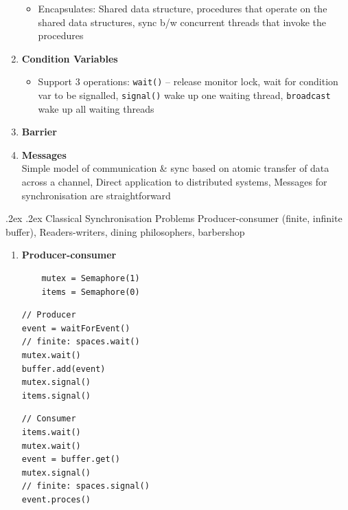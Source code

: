 \documentclass[10pt,landscape,a4paper]{article}
\makeatletter
\renewcommand{\subsubsection}{\@startsection{subsubsection}{1}{0mm}%
  {.2ex}%
  {.2ex}%
{\rmfamily\bfseries}}
\makeatother
\begin{document}
\begin{multicols*}{4}
\begin{enumerate}
\begin{itemize}
            \item Encapsulates: Shared data structure, procedures that operate on the shared data structures, sync b/w concurrent threads that invoke the procedures
          \end{itemize}
    \item \textbf{Condition Variables}
          \begin{itemize}
            \item Support 3 operations: \texttt{wait()} -- release monitor lock, wait for condition var to be signalled, \texttt{signal()} wake up one waiting thread, \texttt{broadcast} wake up all waiting threads
          \end{itemize}
    \item \textbf{Barrier}
    \item \textbf{Messages}\\
          Simple model of communication \& sync based on atomic transfer of data across a channel, Direct application to distributed systems, Messages for synchronisation are straightforward
  \end{enumerate}
  \subsubsection{Classical Synchronisation Problems}
  Producer-consumer (finite, infinite buffer), Readers-writers, dining philosophers, barbershop
  \begin{enumerate}
    \item \textbf{Producer-consumer}
          \begin{verbatim}
    mutex = Semaphore(1)
    items = Semaphore(0)
    \end{verbatim}
          \begin{multicols*}{2}
            \begin{verbatim}
// Producer
event = waitForEvent()
// finite: spaces.wait()
mutex.wait()
buffer.add(event)
mutex.signal()
items.signal()
      \end{verbatim}
            \begin{verbatim}
// Consumer
items.wait()
mutex.wait()
event = buffer.get()
mutex.signal()
// finite: spaces.signal()
event.proces()
      \end{verbatim}
          \end{multicols*}
  \end{enumerate}

\end{multicols*}
\end{document}
